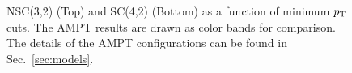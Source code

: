 \documentclass[ALICE,manyauthors]{cernphprep}
\begin{document}
\begin{figure}[htbp]
             \begin{center}
              \end{center}
             \caption{NSC(3,2) (Top) and SC(4,2) (Bottom) as a function of minimum $p_{\rm T}$ cuts. The AMPT results are drawn as color bands for comparison. The details of the AMPT configurations can be found in Sec.~\ref{sec:models}.}
             \label{fig:Figure_8}
\end{figure}
  
\newpage
\end{document}
